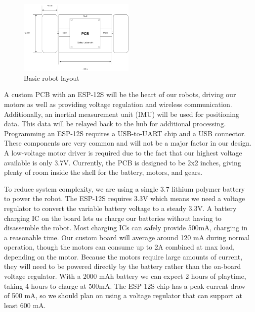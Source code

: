 \documentclass[11pt]{ieeeconf}
\begin{document}
 \begin{figure}[H]
  \centering
      \includegraphics[width=0.5\textwidth]{images/RobotSchematic}
        \caption{Basic robot layout}
        \label{RobotFig}
\end{figure}

A custom PCB with an ESP-12S will be the heart of our robots, driving our motors as well as providing voltage regulation and wireless communication. Additionally, an inertial measurement unit (IMU) will be used for positioning data. This data will be relayed back to the hub for additional processing. Programming an ESP-12S requires a USB-to-UART chip and a USB connector. These components are very common and will not be a major factor in our design. A low-voltage motor driver is required due to the fact that our highest voltage available is only 3.7V. Currently, the PCB is designed to be 2x2 inches, giving plenty of room inside the shell for the battery, motors, and gears.

To reduce system complexity, we are using a single 3.7 lithium polymer battery to power the robot. The ESP-12S requires 3.3V which means we need a voltage regulator to convert the variable battery voltage to a steady 3.3V. A battery charging IC on the board lets us charge our batteries without having to disassemble the robot. Most charging ICs can safely provide 500mA, charging in a reasonable time. Our custom board will average around 120 mA during normal operation, though the motors can consume up to 2A combined at max load, depending on the motor. Because the motors require large amounts of current, they will need to be powered directly by the battery rather than the on-board voltage regulator. With a 2000 mAh battery we can expect 2 hours of playtime, taking 4 hours to charge at 500mA. The ESP-12S chip has a peak current draw of 500 mA, so we should plan on using a voltage regulator that can support at least 600 mA.
\end{document}

